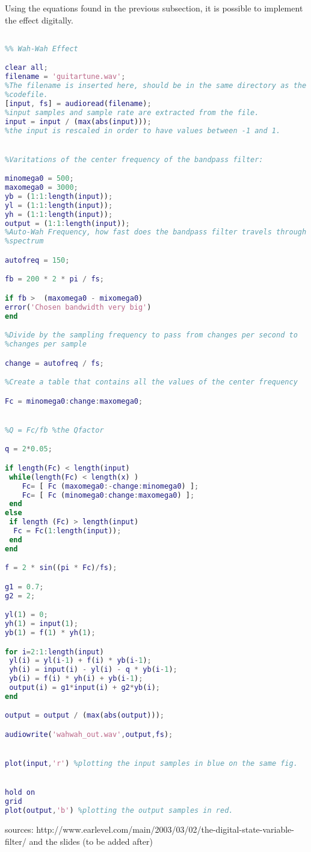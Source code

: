 Using the equations found in the previous subsection, it is possible to implement the effect digitally. 

\begin{lstlisting}[language=Matlab, caption= Matlab code for wah-wah effect]

%% Wah-Wah Effect 

clear all;
filename = 'guitartune.wav'; 
%The filename is inserted here, should be in the same directory as the
%codefile.
[input, fs] = audioread(filename);
%input samples and sample rate are extracted from the file.
input = input / (max(abs(input)));
%the input is rescaled in order to have values between -1 and 1.


%Varitations of the center frequency of the bandpass filter:

minomega0 = 500;
maxomega0 = 3000;
yb = (1:1:length(input));
yl = (1:1:length(input));
yh = (1:1:length(input));
output = (1:1:length(input));
%Auto-Wah Frequency, how fast does the bandpass filter travels through the
%spectrum

autofreq = 150;

fb = 200 * 2 * pi / fs;

if fb >  (maxomega0 - mixomega0)
error('Chosen bandwidth very big')
end

%Divide by the sampling frequency to pass from changes per second to
%changes per sample

change = autofreq / fs;

%Create a table that contains all the values of the center frequency

Fc = minomega0:change:maxomega0;


%Q = Fc/fb %the Qfactor

q = 2*0.05;

if length(Fc) < length(input)
 while(length(Fc) < length(x) )
 	Fc= [ Fc (maxomega0:-change:minomega0) ];
 	Fc= [ Fc (minomega0:change:maxomega0) ];
 end
else 
 if length (Fc) > length(input)
  Fc = Fc(1:length(input));
 end
end

f = 2 * sin((pi * Fc)/fs);

g1 = 0.7;
g2 = 2;

yl(1) = 0;
yh(1) = input(1);
yb(1) = f(1) * yh(1);

for i=2:1:length(input)
 yl(i) = yl(i-1) + f(i) * yb(i-1);
 yh(i) = input(i) - yl(i) - q * yb(i-1);
 yb(i) = f(i) * yh(i) + yb(i-1);
 output(i) = g1*input(i) + g2*yb(i);
end

output = output / (max(abs(output)));

audiowrite('wahwah_out.wav',output,fs);


plot(input,'r') %plotting the input samples in blue on the same fig.


hold on
grid
plot(output,'b') %plotting the output samples in red.

\end{lstlisting}

sources:
http://www.earlevel.com/main/2003/03/02/the-digital-state-variable-filter/ and the slides (to be added after)

